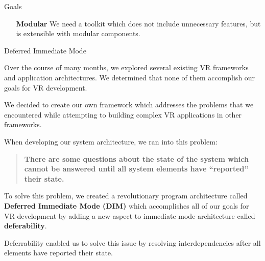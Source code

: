 \documentclass[final]{beamer}
\newlength{\onecolwid}
\begin{document}
\begin{frame}[t]
\begin{columns}[t]
\begin{column}{\onecolwid}
\begin{block}{Goals}
\begin{enumerate}[leftmargin=8.75cm, labelsep=1cm]
                        \item[\textbf{Modular}] We need a toolkit which does
                            not include unnecessary features, but is extensible
                            with modular components.

                    \end{enumerate}

                \end{block}

                \begin{block}{Deferred Immediate Mode}
                    \setlength{\parskip}{0.5em}

                    Over the course of many months, we explored several existing
                    VR frameworks and application architectures. We determined
                    that none of them accomplish our goals for VR development.

                    We decided to create our own framework which addresses the
                    problems that we encountered while attempting to building
                    complex VR applications in other frameworks.

                    When developing our system architecture, we ran into this
                    problem:

                    \begin{quote}

                        \textbf{There are some questions about the state of the
                        system which cannot be answered until all system
                        elements have ``reported'' their state.}

                    \end{quote}

                    To solve this problem, we created a revolutionary program
                    architecture called \textbf{Deferred Immediate Mode (DIM)}
                    which accomplishes all of our goals for VR development by
                    adding a new aspect to immediate mode architecture called
                    \textbf{deferability}.

                    Deferrability enabled us to solve this issue by resolving
                    interdependencies after all elements have reported their
                    state.

                \end{block}


\end{column}
\end{columns}
\end{frame}
\end{document}
